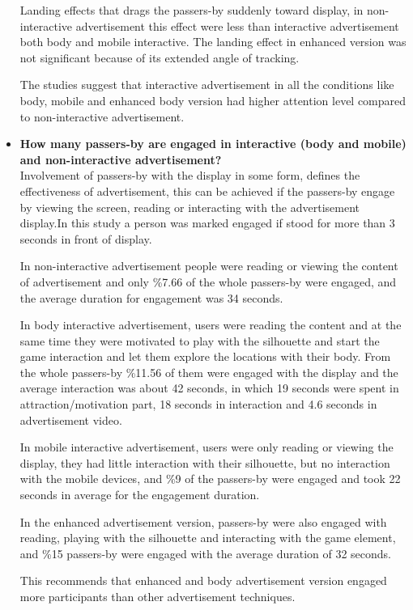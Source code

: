 \begin{itemize}
Landing effects that drags the passers-by suddenly toward display, in non-interactive advertisement this effect were less than interactive advertisement both body and mobile interactive. The landing effect in enhanced version was not significant because of its extended angle of tracking.

The studies suggest that interactive advertisement in all the conditions like body, mobile and enhanced body version had higher attention level compared to non-interactive advertisement. 

\item \textbf{How many passers-by are engaged in interactive (body and mobile) and non-interactive advertisement?} \\
Involvement of passers-by with the display in some form, defines the effectiveness of advertisement, this can be achieved if the passers-by engage by viewing the screen, reading or interacting with the advertisement display.In this study a person was marked engaged if stood for more than 3 seconds in front of display.

In non-interactive advertisement people were reading or viewing the content of advertisement and only \%7.66 of the whole passers-by were engaged, and the average duration for engagement was 34 seconds.

In body interactive advertisement, users were reading the content and at the same time they were motivated to play with the silhouette and start the game interaction and let them explore the locations with their body. From the whole passers-by \%11.56 of them were engaged with the display and the average interaction was about 42 seconds, in which 19 seconds were spent in attraction/motivation part, 18 seconds in interaction and 4.6 seconds in advertisement video.

In mobile interactive advertisement, users were only reading or viewing the display, they had little interaction with their silhouette, but no interaction with the mobile devices, and \%9 of the passers-by were engaged and took 22 seconds in average for the engagement duration.

In the enhanced advertisement version, passers-by were also engaged with reading, playing with the silhouette and interacting with the game element, and \%15 passers-by were engaged with the average duration of 32 seconds. 

This recommends that enhanced and body advertisement version engaged more participants than other advertisement techniques.




\end{itemize}
